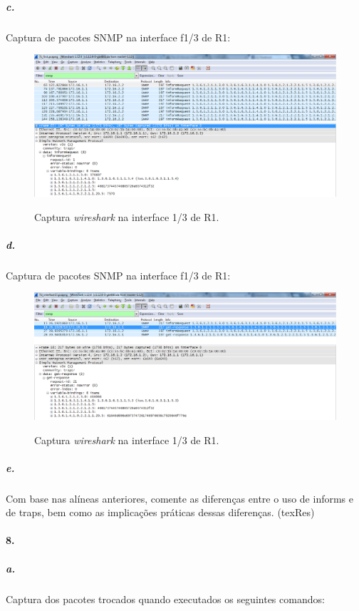 \subparagraph{c.}
Captura de pacotes SNMP na interface \textsf{f1/3} de \textsf{R1}:

\begin{figure}[h]
\centering
\includegraphics[width=1\textwidth, height=0.33\textheight]{7c.png}
\label{fig:2-capturaWireshark}
\caption{Captura \emph{wireshark} na interface \textsf{1/3} de \textsf{R1}.}
\end{figure}


\subparagraph{d.}
Captura de pacotes SNMP na interface \textsf{f1/3} de \textsf{R1}:

\begin{figure}[h]
\centering
\includegraphics[width=1\textwidth, height=0.33\textheight]{7d.png}
\label{fig:2-capturaWireshark}
\caption{Captura \emph{wireshark} na interface \textsf{1/3} de \textsf{R1}.}
\end{figure}


\subparagraph{e.}
Com base nas alíneas anteriores, comente as diferenças entre o uso de informs e de traps, bem como as implicações práticas dessas diferenças. (texRes)


\paragraph{8.}

\subparagraph{a.}
Captura dos pacotes trocados quando executados os seguintes comandos:

